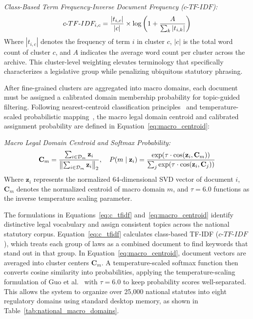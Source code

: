         \noindent\textit{Class-Based Term Frequency-Inverse Document Frequency ($c\text{-}TF\text{-}IDF$):}
        \begin{equation}
            c\text{-}TF\text{-}IDF_{i, c} = \frac{|t_{i, c}|}{|c|} \times \log\left(1 + \frac{A}{\sum_{k} |t_{i, k}|}\right)
            \label{eq:c_tfidf}
            \eqcaption{Class-Based Term Frequency-Inverse Document Frequency ($c\text{-}TF\text{-}IDF$)}
        \end{equation}
        \noindent Where $|t_{i, c}|$ denotes the frequency of term $i$ in cluster $c$, $|c|$ is the total word count of cluster $c$, and $A$ indicates the average word count per cluster across the archive. This cluster-level weighting elevates terminology that specifically characterizes a legislative group while penalizing ubiquitous statutory phrasing.

        After fine-grained clusters are aggregated into macro domains, each document must be assigned a calibrated domain membership probability for topic-guided filtering. Following nearest-centroid classification principles~\cite{rocchio1971relevance, aggarwal2012mining} and temperature-scaled probabilistic mapping~\cite{guo2017calibration}, the macro legal domain centroid and calibrated assignment probability are defined in Equation~\ref{eq:macro_centroid}:

        \noindent\textit{Macro Legal Domain Centroid and Softmax Probability:}
        \begin{equation}
            \mathbf{C}_m = \frac{\sum_{i \in \mathcal{D}_m} \mathbf{z}_i}{\left\|\sum_{i \in \mathcal{D}_m} \mathbf{z}_i\right\|_2}, \quad P(m \mid \mathbf{z}_i) = \frac{\exp(\tau \cdot \cos(\mathbf{z}_i, \mathbf{C}_m))}{\sum_{j} \exp(\tau \cdot \cos(\mathbf{z}_i, \mathbf{C}_j))}
            \label{eq:macro_centroid}
            \eqcaption{Macro Legal Domain Centroid and Softmax Probability}
        \end{equation}
        \noindent Where $\mathbf{z}_i$ represents the normalized 64-dimensional SVD vector of document $i$, $\mathbf{C}_m$ denotes the normalized centroid of macro domain $m$, and $\tau = 6.0$ functions as the inverse temperature scaling parameter.

        The formulations in Equations~\ref{eq:c_tfidf} and~\ref{eq:macro_centroid} identify distinctive legal vocabulary and assign consistent topics across the national statutory corpus. Equation~\ref{eq:c_tfidf} calculates class-based TF-IDF ($c\text{-}TF\text{-}IDF$), which treats each group of laws as a combined document to find keywords that stand out in that group. In Equation~\ref{eq:macro_centroid}, document vectors are averaged into cluster centers $\mathbf{C}_m$. A temperature-scaled softmax function then converts cosine similarity into probabilities, applying the temperature-scaling formulation of Guo et al.~\cite{guo2017calibration} with $\tau = 6.0$ to keep probability scores well-separated. This allows the system to organize over 25,000 national statutes into eight regulatory domains using standard desktop memory, as shown in Table~\ref{tab:national_macro_domains}.

